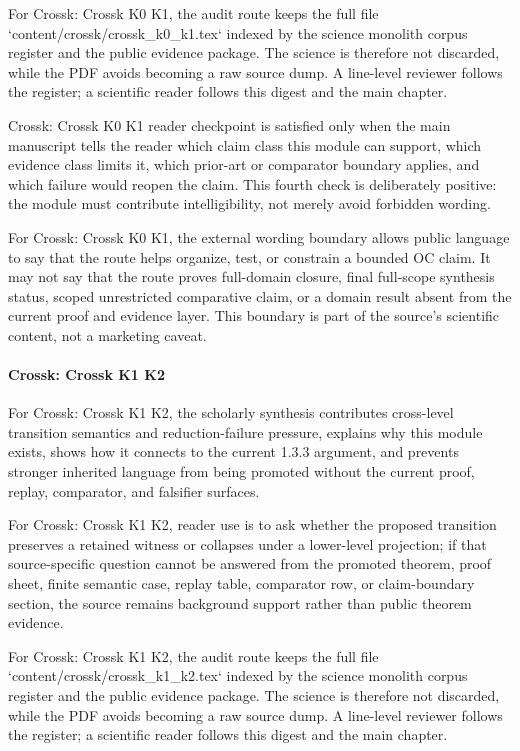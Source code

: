 For Crossk: Crossk K0 K1, the audit route keeps the full file `content/crossk/crossk\_k0\_k1.tex` indexed by the science monolith corpus register and the public evidence package. The science is therefore not discarded, while the PDF avoids becoming a raw source dump. A line-level reviewer follows the register; a scientific reader follows this digest and the main chapter.


Crossk: Crossk K0 K1 reader checkpoint is satisfied only when the main manuscript tells the reader which claim class this module can support, which evidence class limits it, which prior-art or comparator boundary applies, and which failure would reopen the claim. This fourth check is deliberately positive: the module must contribute intelligibility, not merely avoid forbidden wording.


For Crossk: Crossk K0 K1, the external wording boundary allows public language to say that the route helps organize, test, or constrain a bounded OC claim. It may not say that the route proves full-domain closure, final full-scope synthesis status, scoped unrestricted comparative claim, or a domain result absent from the current proof and evidence layer. This boundary is part of the source's scientific content, not a marketing caveat.


\paragraph{Crossk: Crossk K1 K2}

For Crossk: Crossk K1 K2, the scholarly synthesis contributes cross-level transition semantics and reduction-failure pressure, explains why this module exists, shows how it connects to the current 1.3.3 argument, and prevents stronger inherited language from being promoted without the current proof, replay, comparator, and falsifier surfaces.


For Crossk: Crossk K1 K2, reader use is to ask whether the proposed transition preserves a retained witness or collapses under a lower-level projection; if that source-specific question cannot be answered from the promoted theorem, proof sheet, finite semantic case, replay table, comparator row, or claim-boundary section, the source remains background support rather than public theorem evidence.


For Crossk: Crossk K1 K2, the audit route keeps the full file `content/crossk/crossk\_k1\_k2.tex` indexed by the science monolith corpus register and the public evidence package. The science is therefore not discarded, while the PDF avoids becoming a raw source dump. A line-level reviewer follows the register; a scientific reader follows this digest and the main chapter.


